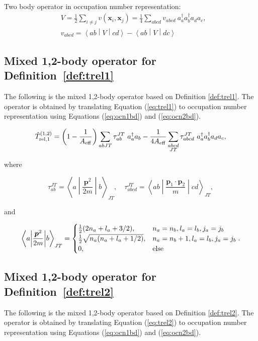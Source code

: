 \documentclass{article}
\def\aeff{A_{\rm{eff}}}
\def\trelopi_#1^#2{\hat{T}_{\rm{rel}, #1}^{#2}}
\def\momvect{\boldsymbol{p}}
\def\posvect{\boldsymbol{x}}
\def\creop{a^{\dagger}}
\def\annop{a}
\def\matelt#1#2#3{\left\langle{#1}\middle|{#2}\middle|{#3}\right\rangle}
\begin{document}
Two body operator in occupation number representation:
\begin{equation}\label{eq:ocn2bd}
  \begin{aligned}
    &V = \frac{1}{2}\displaystyle\sum_{i \neq j}
    v\left(\posvect_i, \posvect_j\right) =
    \frac{1}{4}\displaystyle\sum_{abcd}
    v_{abcd}~\creop_a\creop_b\annop_d\annop_c,\\
    &v_{abcd} = \matelt{ab}{V}{cd} - \matelt{ab}{V}{dc}
  \end{aligned}
\end{equation}

\subsection{Mixed 1,2-body operator for Definition~\ref{def:trel1}}
The following is the mixed 1,2-body operator based on Definition
\ref{def:trel1}. The operator is obtained by translating Equation
(\ref{eq:trel1}) to occupation number representation using Equations
(\ref{eq:ocn1bd}) and (\ref{eq:ocn2bd}).

\begin{equation}\label{eq:trel1op1,2}
  \trelopi_1^{(1,2)} = \left(1-\frac{1}{\aeff}\right)
  \displaystyle\sum_{abJT}\tau_{ab}^{JT}~\creop_a\annop_b
  -\frac{1}{4\aeff} \displaystyle\sum_{\substack{abcd\\JT}}
  \tau_{abcd}^{JT}~\creop_a\creop_b\annop_d\annop_c,
\end{equation}

where

\begin{equation}\label{eq:tab,tabcd}
  \tau_{ab}^{JT} = \matelt{a}{\frac{\momvect^2}{2m}}{b}_{JT}, \quad
  \tau_{abcd}^{JT} = \matelt{ab}{\frac{\momvect_1\cdot\momvect_2}{m}}{cd}_{JT},
\end{equation}

and

\begin{equation*}
  \matelt{a}{\frac{\momvect^2}{2m}}{b}_{JT} = 
  \begin{cases}
    \frac{1}{2}(2n_a+l_a+3/2),
    & n_a=n_b, l_a=l_b, j_a=j_b\\
    \frac{1}{2}\sqrt{n_a(n_a+l_a+1/2)}, 
    & n_a=n_b+1, l_a=l_b, j_a=j_b\\
    0, & \rm{else}
  \end{cases}.
\end{equation*}

\subsection{Mixed 1,2-body operator for Definition~\ref{def:trel2}}
The following is the mixed 1,2-body operator based on Definition
\ref{def:trel2}. The operator is obtained by translating Equation
(\ref{eq:trel2}) to occupation number representation using Equations
(\ref{eq:ocn1bd}) and (\ref{eq:ocn2bd}).
\end{document}
